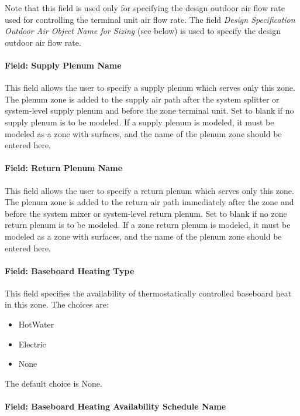 Note that this field is used only for specifying the design outdoor air flow rate used for controlling the terminal unit air flow rate. The field \emph{Design Specification Outdoor Air Object Name for Sizing} (see below) is used to specify the design outdoor air flow rate.

\paragraph{Field: Supply Plenum Name}\label{field-supply-plenum-name-1}

This field allows the user to specify a supply plenum which serves only this zone. The plenum zone is added to the supply air path after the system splitter or system-level supply plenum and before the zone terminal unit. Set to blank if no supply plenum is to be modeled. If a supply plenum is modeled, it must be modeled as a zone with surfaces, and the name of the plenum zone should be entered here.

\paragraph{Field: Return Plenum Name}\label{field-return-plenum-name-1}

This field allows the user to specify a return plenum which serves only this zone. The plenum zone is added to the return air path immediately after the zone and before the system mixer or system-level return plenum. Set to blank if no zone return plenum is to be modeled. If a zone return plenum is modeled, it must be modeled as a zone with surfaces, and the name of the plenum zone should be entered here.

\paragraph{Field: Baseboard Heating Type}\label{field-baseboard-heating-type-7}

This field specifies the availability of thermostatically controlled baseboard heat in this zone. The choices are:

\begin{itemize}
\item
  HotWater
\item
  Electric
\item
  None
\end{itemize}

The default choice is None.

\paragraph{Field: Baseboard Heating Availability Schedule Name}\label{field-baseboard-heating-availability-schedule-name-7}

